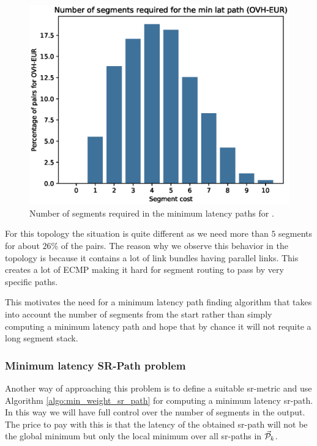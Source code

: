 \begin{figure}
\begin{center}
\includegraphics[scale=0.6]{./Network-lib/data/plot/minLat_seg_ovh.eps}
\end{center}
\caption{Number of segments required in the minimum latency paths for .}
\label{fig:minlat_seg_ovh}
\end{figure}

For this topology the situation is quite different as we need more than $5$ segments for about $26$\% of the pairs.
The reason why we observe this behavior in the  topology is because it contains a lot of link
bundles having parallel links. This creates a lot of ECMP making it hard for segment routing to pass by
very specific paths.

This motivates the need for a minimum latency path finding algorithm that takes into account the number of 
segments from the start rather than simply computing a minimum latency path and hope that by chance it will
not requite a long segment stack.


\subsubsection{Minimum latency SR-Path problem}

Another way of approaching this problem is to define a suitable sr-metric and use Algorithm \ref{algo:min_weight_sr_path} for computing a minimum 
latency sr-path. In this way
we will have full control over the number of segments in the output. The price to pay with this is that the latency of the obtained sr-path
will not be the global minimum but only the local minimum over all sr-paths in $\mathcal{\vec{P}}_k$.

